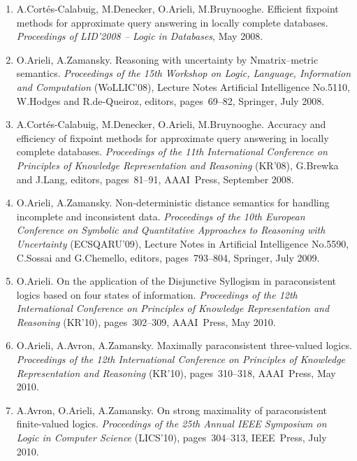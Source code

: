 \documentclass{article}
\begin{document}
\begin{enumerate}
   \item A.Cort\'es-Calabuig, M.Denecker, O.Arieli, M.Bruynooghe.
         Efficient fixpoint methods for approximate query answering in locally complete
         databases. {\em Proceedings of LID'2008 -- Logic in Databases\/}, May 2008.

   \item O.Arieli, A.Zamansky.
         Reasoning with uncertainty by Nmatrix--metric semantics.
         {\em Proceedings of the 15th Workshop on Logic, Language, Information and
         Computation\/} (WoLLIC'08), Lecture Notes Artificial
         Intelligence No.5110, W.Hodges and R.de-Queiroz, editors, pages~69--82,
         Springer, July 2008.

   \item A.Cort\'es-Calabuig, M.Denecker, O.Arieli, M.Bruynooghe.
         Accuracy and efficiency of fixpoint methods for approximate query answering in
         locally complete databases. {\em Proceedings of the 11th International Conference
         on Principles of Knowledge Representation and Reasoning\/} (KR'08),
         G.Brewka and J.Lang, editors, pages~81--91, AAAI~Press, September 2008.

   \item O.Arieli, A.Zamansky.
         Non-deterministic distance semantics for handling incomplete and inconsistent data.
         {\em Proceedings of the 10th European Conference on Symbolic and Quantitative Approaches to
         Reasoning with Uncertainty\/} (ECSQARU'09), Lecture Notes in Artificial Intelligence
         No.5590, C.Sossai and G.Chemello, editors, pages~793--804, Springer, July 2009.

   \item O.Arieli.
         On the application of the Disjunctive Syllogism in paraconsistent logics based on
         four states of information. {\em Proceedings of the 12th International Conference
         on Principles of Knowledge Representation and Reasoning\/} (KR'10),
         pages~302--309, AAAI~Press, May 2010.

   \item O.Arieli, A.Avron, A.Zamansky.
         Maximally paraconsistent three-valued logics. {\em Proceedings of the 12th International
         Conference on Principles of Knowledge Representation and Reasoning\/} (KR'10),
         pages~310--318, AAAI~Press, May 2010.

   \item A.Avron, O.Arieli, A.Zamansky.
         On strong maximality of paraconsistent finite-valued logics.
         {\em Proceedings of the 25th Annual IEEE Symposium on Logic in Computer Science\/} (LICS'10),
         pages~304--313, IEEE~Press, July 2010.


\end{enumerate}
\end{document}
